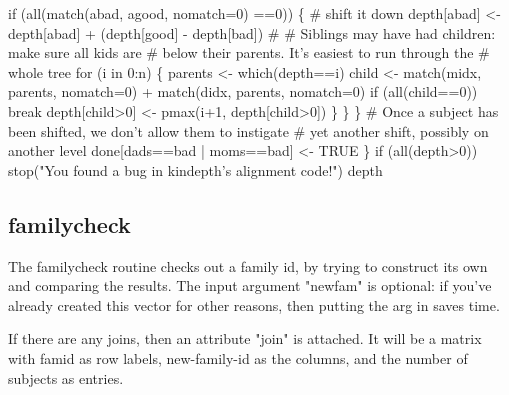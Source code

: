 \documentclass{article}
\begin{document}
\begin{nwchunk}
     if (all(match(abad, agood, nomatch=0) ==0)) \{
       # shift it down
       depth[abad] <- depth[abad] + (depth[good] - depth[bad])
       #
       # Siblings may have had children: make sure all kids are
       #   below their parents.  It's easiest to run through the
       #   whole tree
       for (i in 0:n) \{
         parents <- which(depth==i)
         child <- match(midx, parents, nomatch=0) +
             match(didx, parents, nomatch=0)
         if (all(child==0)) break
         depth[child>0] <- pmax(i+1, depth[child>0])
       \}
     \}
   \}
   # Once a subject has been shifted, we don't allow them to instigate
   #  yet another shift, possibly on another level
   done[dads==bad | moms==bad] <- TRUE
 \}
 if (all(depth>0)) stop("You found a bug in kindepth's alignment code!")
 depth
\end{nwchunk}

\subsection{familycheck}
The familycheck routine checks out a family id, by trying to construct its own
and comparing the results.
The input argument "newfam" is optional: if you've already created this
vector for other reasons, then putting the arg in saves time.


  If there are any joins, then an attribute "join" is attached.  It will be
   a matrix with famid as row labels, new-family-id as the columns, and
   the number of subjects as entries.  
\end{document}
